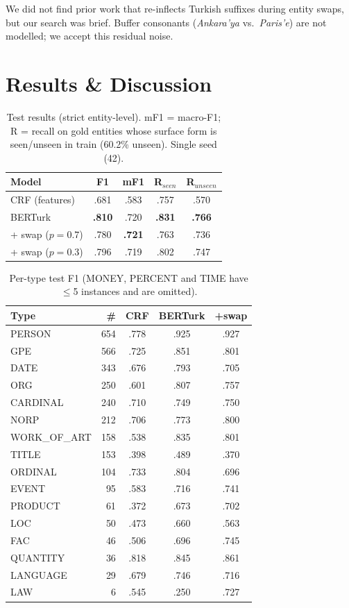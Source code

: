 \documentclass[11pt]{article}
\begin{document}
We did not find prior work that re-inflects Turkish suffixes during entity swaps, but our search was brief. Buffer consonants (\textit{Ankara'ya} vs.\ \textit{Paris'e}) are not modelled; we accept this residual noise.

\section{Results \& Discussion}
\begin{table}[t]
\centering\small
\begin{tabular}{lcccc}
\toprule
Model & F1 & mF1 & R$_{seen}$ & R$_{unseen}$ \\
\midrule
CRF (features) & .681 & .583 & .757 & .570 \\
BERTurk & \textbf{.810} & .720 & \textbf{.831} & \textbf{.766} \\
\quad + swap ($p{=}0.7$) & .780 & \textbf{.721} & .763 & .736 \\
\quad + swap ($p{=}0.3$) & .796 & .719 & .802 & .747 \\
\bottomrule
\end{tabular}
\caption{Test results (strict entity-level). mF1 = macro-F1; R = recall on gold entities whose surface form is seen/unseen in train (60.2\% unseen). Single seed (42).}
\label{tab:main}
\end{table}

\begin{table}[t]
\centering\small
\begin{tabular}{lrccc}
\toprule
Type & \# & CRF & BERTurk & +swap \\
\midrule
PERSON & 654 & .778 & .925 & .927 \\
GPE & 566 & .725 & .851 & .801 \\
DATE & 343 & .676 & .793 & .705 \\
ORG & 250 & .601 & .807 & .757 \\
CARDINAL & 240 & .710 & .749 & .750 \\
NORP & 212 & .706 & .773 & .800 \\
WORK\_OF\_ART & 158 & .538 & .835 & .801 \\
TITLE & 153 & .398 & .489 & .370 \\
ORDINAL & 104 & .733 & .804 & .696 \\
EVENT & 95 & .583 & .716 & .741 \\
PRODUCT & 61 & .372 & .673 & .702 \\
LOC & 50 & .473 & .660 & .563 \\
FAC & 46 & .506 & .696 & .745 \\
QUANTITY & 36 & .818 & .845 & .861 \\
LANGUAGE & 29 & .679 & .746 & .716 \\
LAW & 6 & .545 & .250 & .727 \\
\bottomrule
\end{tabular}
\caption{Per-type test F1 (MONEY, PERCENT and TIME have $\le$5 instances and are omitted).}
\label{tab:types}
\end{table}
\end{document}
